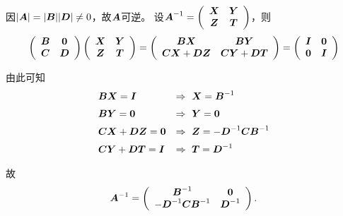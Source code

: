 \begin{jie}
  因$|\boldsymbol{A}|=|\boldsymbol{B}||\boldsymbol{D}|\ne 0$，故$\boldsymbol{A}$可逆。 设$\boldsymbol{A}^{-1}=\left(
    \begin{array}{cc}
      \boldsymbol{X}&\boldsymbol{Y}\\
      \boldsymbol{Z}&\boldsymbol{T}
    \end{array}
  \right)$，则
  $$
  \left(
    \begin{array}{cc}
      \MB&\M0\\
      \MC&\MD
    \end{array}
  \right) \left(
    \begin{array}{cc}
      \MX&\MY\\
      \MZ&\MT
    \end{array}
  \right)=\left(
    \begin{array}{cc}
      \MB\MX&\MB\MY\\
      \MC\MX+\MD\MZ&\MC\MY+\MD\MT
    \end{array}
  \right) = \left(
    \begin{array}{cc}
      \MI & \M0\\
      \M0 & \MI
    \end{array}
  \right)
  $$

  由此可知
  $$
  \begin{array}{ll}
    \MB\MX = \MI   & \Rightarrow ~ \MX = \MB^{-1}\\[0.2cm]
    \MB\MY = \M0 & \Rightarrow ~ \MY = \M0\\[0.2cm]
    \MC\MX+\MD\MZ = \M0 & \Rightarrow ~ \MZ = -\MD^{-1}\MC\MB^{-1}\\[0.2cm]
    \MC\MY+\MD\MT = \MI & \Rightarrow ~ \MT = \MD^{-1}
  \end{array}
  $$

  故
  $$
  \MA^{-1} = \left(
    \begin{array}{cc}
      \MB^{-1} & \M0\\
      -\MD^{-1}\MC\MB^{-1} & \MD^{-1}
    \end{array}
  \right).
  $$
\end{jie}







